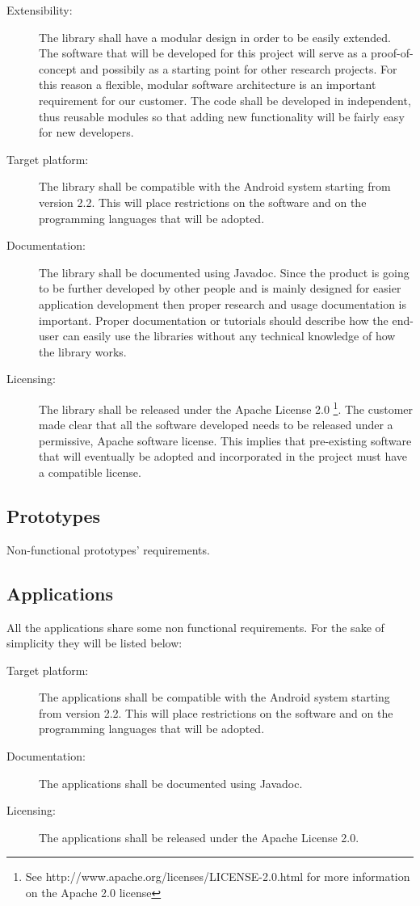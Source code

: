 \begin{description}
	\item[Extensibility:] The library shall have a modular design
	in order to be easily extended. The software that will be developed for
	this project will serve as a proof-of-concept and possibily as a starting point
	for other research projects. For this reason a flexible, modular software
	architecture is an important requirement for our customer. The code shall be
	developed in independent, thus reusable modules so that adding new functionality
	will be fairly easy for new developers.
	\item[Target platform:] The library shall be compatible with the Android
	system starting from version 2.2. This will place restrictions on the software
	and on the programming languages that will be adopted.
	\item[Documentation:] The library shall be documented using Javadoc.
	Since the product is going to be further developed by other people and is
	mainly designed for easier application development then proper research and usage
	documentation is important. Proper documentation or tutorials should describe how
	the end-user can easily use the libraries without any technical knowledge of how
	the library works.
	\item[Licensing:] The library shall be released under the Apache License 2.0 \footnote{See 
           http://www.apache.org/licenses/LICENSE-2.0.html for more information on the Apache 2.0 license}.
	The customer made clear that all the software developed needs to be released
	under a permissive, Apache software license. This implies that pre-existing
	software that will eventually be adopted and incorporated in the project must
	have a compatible license.
\end{description}


\subsection{Prototypes}

Non-functional prototypes' requirements.




\subsection{Applications}

All the applications share some non functional requirements.
For the sake of simplicity they will be listed below:

\begin{description}
	\item[Target platform:] The applications shall be compatible with the Android
	system starting from version 2.2. This will place restrictions on the software
	and on the programming languages that will be adopted.
	\item[Documentation:] The applications shall be documented using Javadoc.
	\item[Licensing:] The applications shall be released under the Apache License 2.0.
\end{description}


